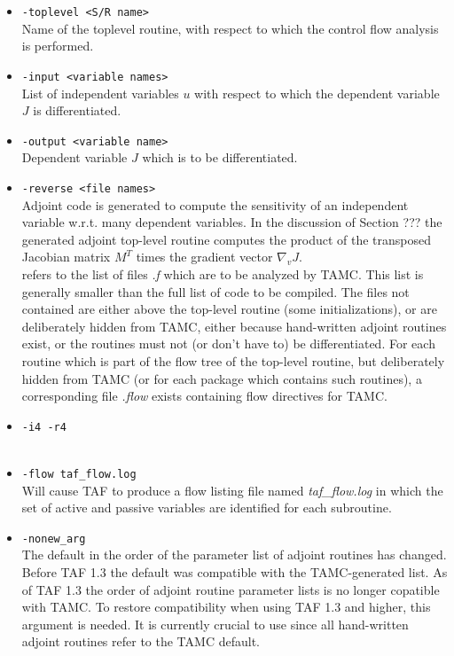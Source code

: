 \begin{itemize}
%
\item {\tt -toplevel <S/R name>} \\
Name of the toplevel routine, with respect to which the
control flow analysis is performed.
%
\item {\tt -input <variable names>} \\
List of independent variables $ u $ with respect to which the
dependent variable $ J $ is differentiated.
%
\item {\tt -output <variable name>} \\
Dependent variable $ J $  which is to be differentiated.
%
\item {\tt -reverse <file names>} \\
Adjoint code is generated to compute the sensitivity of an
independent variable w.r.t.  many dependent variables.
In the discussion of Section ???
the generated adjoint top-level routine computes the product
of the transposed Jacobian matrix $ M^T $ times
the gradient vector $ \nabla_v J $.
\\
{\tt <file names>} refers to the list of files {\it .f} which are to be
analyzed by TAMC. This list is generally smaller than the full list
of code to be compiled. The files not contained are either
above the top-level routine (some initializations), or are
deliberately hidden from TAMC, either because hand-written
adjoint routines exist, or the routines must not (or don't have to)
be differentiated. For each routine which is part of the flow tree
of the top-level routine, but deliberately hidden from TAMC
(or for each package which contains such routines),
a corresponding file {\it .flow} exists containing flow directives
for TAMC.
%
\item {\tt -i4 -r4} \\
~
%
\item {\tt -flow taf\_flow.log} \\
Will cause TAF to produce a flow listing file 
named {\it taf\_flow.log} in which 
the set of active and passive variables are identified
for each subroutine.
%
\item {\tt -nonew\_arg} \\
The default in the order of the parameter list of
adjoint routines has changed.
Before TAF 1.3 the default was compatible with the
TAMC-generated list. As of TAF 1.3 the order of adjoint
routine parameter lists is no longer copatible with TAMC.
To restore compatibility when using TAF 1.3 and higher,
this argument is needed.
It is currently crucial to use since all hand-written
adjoint routines refer to the TAMC default.
%
\end{itemize}


